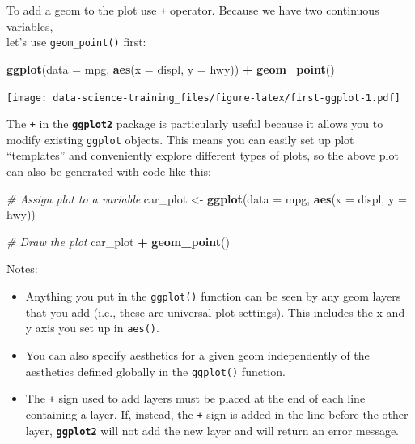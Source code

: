 \documentclass[]{book}
\newenvironment{Shaded}{\begin{snugshade}}{\end{snugshade}}
\newcommand{\KeywordTok}[1]{\textcolor[rgb]{0.13,0.29,0.53}{\textbf{#1}}}
\newcommand{\DataTypeTok}[1]{\textcolor[rgb]{0.13,0.29,0.53}{#1}}
\newcommand{\StringTok}[1]{\textcolor[rgb]{0.31,0.60,0.02}{#1}}
\newcommand{\CommentTok}[1]{\textcolor[rgb]{0.56,0.35,0.01}{\textit{#1}}}
\newcommand{\OperatorTok}[1]{\textcolor[rgb]{0.81,0.36,0.00}{\textbf{#1}}}
\newcommand{\NormalTok}[1]{#1}
\providecommand{\tightlist}{%
  \setlength{\itemsep}{0pt}\setlength{\parskip}{0pt}}
\theoremstyle{definition}
\theoremstyle{definition}
\theoremstyle{definition}
\theoremstyle{remark}
\begin{document}
To add a geom to the plot use \texttt{+} operator. Because we have two
continuous variables,\\
let's use \texttt{geom\_point()} first:

\begin{Shaded}
\begin{Highlighting}[]
\KeywordTok{ggplot}\NormalTok{(}\DataTypeTok{data =}\NormalTok{ mpg, }\KeywordTok{aes}\NormalTok{(}\DataTypeTok{x =}\NormalTok{ displ, }\DataTypeTok{y =}\NormalTok{ hwy)) }\OperatorTok{+}\StringTok{ }
\StringTok{  }\KeywordTok{geom_point}\NormalTok{()}
\end{Highlighting}
\end{Shaded}

\texttt{[image: data-science-training\_files/figure-latex/first-ggplot-1.pdf]}

The \texttt{+} in the \textbf{\texttt{ggplot2}} package is particularly
useful because it allows you to modify existing \texttt{ggplot} objects.
This means you can easily set up plot ``templates'' and conveniently
explore different types of plots, so the above plot can also be
generated with code like this:

\begin{Shaded}
\begin{Highlighting}[]
\CommentTok{# Assign plot to a variable}
\NormalTok{car_plot <-}\StringTok{ }\KeywordTok{ggplot}\NormalTok{(}\DataTypeTok{data =}\NormalTok{ mpg, }\KeywordTok{aes}\NormalTok{(}\DataTypeTok{x =}\NormalTok{ displ, }\DataTypeTok{y =}\NormalTok{ hwy))}

\CommentTok{# Draw the plot}
\NormalTok{car_plot }\OperatorTok{+}\StringTok{ }
\StringTok{    }\KeywordTok{geom_point}\NormalTok{()}
\end{Highlighting}
\end{Shaded}

Notes:

\begin{itemize}
\tightlist
\item
  Anything you put in the \texttt{ggplot()} function can be seen by any
  geom layers that you add (i.e., these are universal plot settings).
  This includes the x and y axis you set up in \texttt{aes()}.
\item
  You can also specify aesthetics for a given geom independently of the
  aesthetics defined globally in the \texttt{ggplot()} function.
\item
  The \texttt{+} sign used to add layers must be placed at the end of
  each line containing a layer. If, instead, the \texttt{+} sign is
  added in the line before the other layer, \textbf{\texttt{ggplot2}}
  will not add the new layer and will return an error message.
\end{itemize}
\end{document}

